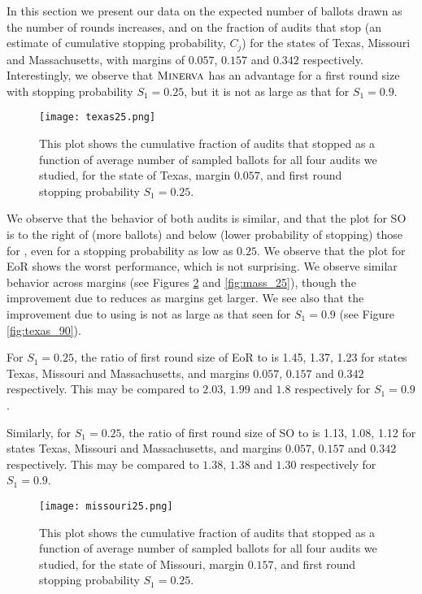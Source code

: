 In this section we present our data on the expected number of ballots drawn as the number of rounds increases, and on the fraction of audits that stop (an estimate of cumulative stopping probability, $C_j$) for the states of Texas, Missouri and Massachusetts, with margins of $0.057$, $0.157$ and $0.342$ respectively. Interestingly, we observe that $\textsc{Minerva}$ has an advantage for a first round size with stopping probability $S_1=0.25$, but it is not as large as that for $S_1=0.9$. 

\begin{figure}
\begin{centering}
\texttt{[image: texas25.png]}
\caption{This plot shows the cumulative fraction of audits that stopped as a function of average number of sampled ballots for all four audits we studied, for the state of Texas, margin $0.057$, and first round stopping probability $S_1=0.25$.}
\label{fig:texas_25}
\end{centering}
\end{figure}

We observe that the behavior of both \Minerva audits is similar, and that the plot for SO \BRAVO is to the right of (more ballots) and below (lower probability of stopping) those for \Minerva, even for a stopping probability as low as $0.25$. We observe that the plot for EoR \BRAVO shows the worst performance, which is not surprising. We observe similar behavior across margins (see Figures \ref{fig:missouri_25} and \ref{fig:mass_25}), though the improvement due to \Minerva reduces as margins get larger. We see also that the improvement due to using \Minerva is not as large as that seen for $S_1=0.9$ (see Figure \ref{fig:texas_90}). 

For $S_1=0.25$, the ratio of first round size of EoR \BRAVO to \Minerva is 1.45, 1.37, 1.23 for states Texas, Missouri and Massachusetts, and margins $0.057$, $0.157$ and $0.342$ respectively. This may be compared to $2.03$, $1.99$ and $1.8$ respectively for $S_1=0.9$. 

Similarly, for $S_1=0.25$, the ratio of first round size of SO \BRAVO to \Minerva is 1.13, 1.08, 1.12 for states Texas, Missouri and Massachusetts, and margins $0.057$, $0.157$ and $0.342$ respectively. This may be compared to $1.38$, $1.38$ and $1.30$ respectively for $S_1=0.9$. 

\begin{figure}
\begin{centering}
\texttt{[image: missouri25.png]}
\caption{This plot shows the cumulative fraction of audits that stopped as a function of average number of sampled ballots for all four audits we studied, for the state of Missouri, margin $0.157$, and first round stopping probability $S_1=0.25$.}
\label{fig:missouri_25}
\end{centering}
\end{figure}

